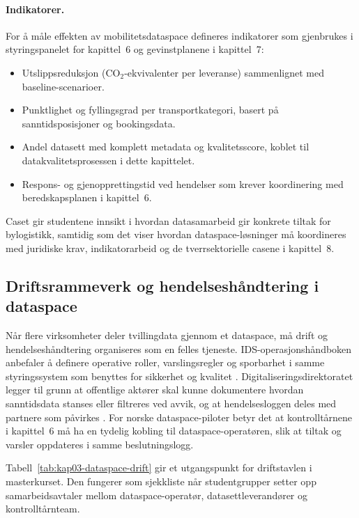 \paragraph{Indikatorer.} For å måle effekten av mobilitetsdataspace defineres indikatorer som gjenbrukes i styringspanelet for
kapittel~6 og gevinstplanene i kapittel~7:
\begin{itemize}
    \item Utslippsreduksjon (CO$_2$-ekvivalenter per leveranse) sammenlignet med baseline-scenarioer.
    \item Punktlighet og fyllingsgrad per transportkategori, basert på sanntidsposisjoner og bookingsdata.
    \item Andel datasett med komplett metadata og kvalitetsscore, koblet til datakvalitetsprosessen i dette kapittelet.
    \item Respons- og gjenopprettingstid ved hendelser som krever koordinering med beredskapsplanen i kapittel~6.
\end{itemize}

Caset gir studentene innsikt i hvordan datasamarbeid gir konkrete tiltak for bylogistikk, samtidig som det viser hvordan
dataspace-løsninger må koordineres med juridiske krav, indikatorarbeid og de tverrsektorielle casene i kapittel~8.

\subsection{Driftsrammeverk og hendelseshåndtering i dataspace}
Når flere virksomheter deler tvillingdata gjennom et dataspace, må drift og hendelseshåndtering organiseres som en felles
tjeneste. IDS-operasjonshåndboken anbefaler å definere operative roller, varslingsregler og sporbarhet i samme
styringssystem som benyttes for sikkerhet og kvalitet \citep{idsa2023operational}. Digitaliseringsdirektoratet legger
til grunn at offentlige aktører skal kunne dokumentere hvordan sanntidsdata stanses eller filtreres ved avvik, og at
hendelsesloggen deles med partnere som påvirkes \citep{digdir2024sanntidsdata}. For norske dataspace-piloter betyr det at
kontrolltårnene i kapittel~6 må ha en tydelig kobling til dataspace-operatøren, slik at tiltak og varsler oppdateres i samme
beslutningslogg.

Tabell~\ref{tab:kap03-dataspace-drift} gir et utgangspunkt for driftstavlen i masterkurset. Den fungerer som sjekkliste når
studentgrupper setter opp samarbeidsavtaler mellom dataspace-operatør, datasettleverandører og kontrolltårnteam.

